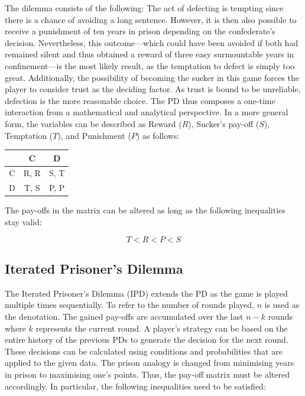 \documentclass[11pt]{article}
\begin{document}
\noindent
The dilemma consists of the following:
The act of defecting is tempting since there is a chance of avoiding a long sentence.
However, it is then also possible to receive a punishment of ten years in prison depending on the confederate's decision.
Nevertheless, this outcome---which could have been avoided if both had remained silent and thus obtained a reward of three easy surmountable years in confinement---is the most likely result, as the temptation to defect is simply too great.
Additionally, the possibility of becoming the sucker in this game forces the player to consider trust as the deciding factor.
As trust is bound to be unreliable, defection is the more reasonable choice.
The PD thus composes a one-time interaction from a mathematical and analytical perspective. 
In a more general form, the variables can be described as Reward ($R$), Sucker's pay-off ($S$), Temptation ($T$), and Punishment ($P$) as follows:

\begin{center}
\begin{tabular}{ c|c|c }
   & C & D \\ 
   \hline
 C & R, R & S, T\\  
   \hline
 D & T, S & P, P
\end{tabular}
\end{center}

\noindent The pay-offs in the matrix can be altered as long as the following inequalities stay valid:

\begin{equation}
	T < R < P < S
	\label{eq:TRPS}
\end{equation}

\subsection{Iterated Prisoner's Dilemma}
		
The Iterated Prisoner's Dilemma (IPD) extends the PD as the game is played multiple times sequentially. 
To refer to the number of rounds played, $n$ is used as the denotation. 
The gained pay-offs are accumulated over the last $n-k$ rounds where $k$ represents the current round.
A player's strategy can be based on the entire history of the previous PDs to generate the decision for the next round.
These decisions can be calculated using conditions and probabilities that are applied to the given data.
The prison analogy is changed from minimising years in prison to maximising one's points.
Thus, the pay-off matrix must be altered accordingly.
In particular, the following inequalities need to be satisfied:
%
\end{document}
